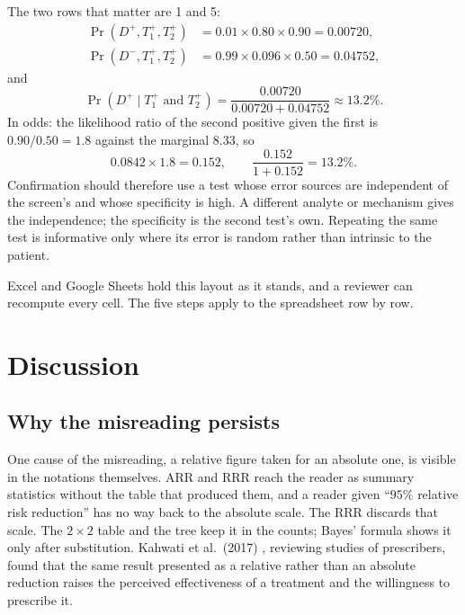 \documentclass[11pt]{article}
\begin{document}
The two rows that matter are 1 and 5:
\begin{align*}
  \Pr(D^+, T_1^+, T_2^+)      &= 0.01 \times 0.80 \times 0.90 = 0.00720, \\
  \Pr(D^-, T_1^+, T_2^+) &= 0.99 \times 0.096 \times 0.50 = 0.04752,
\end{align*}
and
\begin{equation*}
  \Pr(D^+ \mid T_1^+ \text{ and } T_2^+) = \frac{0.00720}{0.00720 + 0.04752} \approx 13.2\%.
\end{equation*}
In odds: the likelihood ratio of the second positive given the first is $0.90 / 0.50 = 1.8$ against the marginal $8.33$, so
\begin{equation*}
  0.0842 \times 1.8 = 0.152, \qquad \frac{0.152}{1 + 0.152} = 13.2\%.
\end{equation*}
Confirmation should therefore use a test whose error sources are independent of the screen's and whose specificity is high. A different analyte or mechanism gives the independence; the specificity is the second test's own. Repeating the same test is informative only where its error is random rather than intrinsic to the patient.

Excel and Google Sheets hold this layout as it stands, and a reviewer can recompute every cell. The five steps apply to the spreadsheet row by row.

\section{Discussion}
\label{sec:disc}

\subsection{Why the misreading persists}

One cause of the misreading, a relative figure taken for an absolute one, is visible in the notations themselves. ARR and RRR reach the reader as summary statistics without the table that produced them, and a reader given ``$95\%$ relative risk reduction'' has no way back to the absolute scale. The RRR discards that scale. The $2\times 2$ table and the tree keep it in the counts; Bayes' formula shows it only after substitution. Kahwati et al.\ (2017) \cite{kahwati2017}, reviewing studies of prescribers, found that the same result presented as a relative rather than an absolute reduction raises the perceived effectiveness of a treatment and the willingness to prescribe it.
\end{document}
